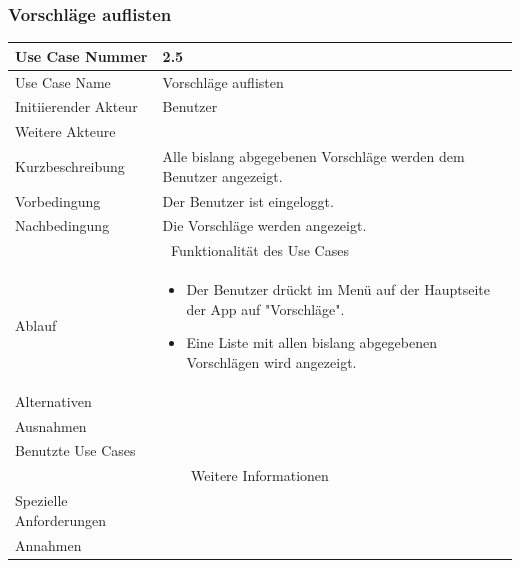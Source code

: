 \documentclass[10pt,a4paper]{article}
\begin{document}
\subsubsection{Vorschl\"age auflisten}
	\begin{tabular}{|l|p{.5\linewidth}|}
	\hline Use Case Nummer & 2.5 \\ 
	\hline Use Case Name & Vorschl\"age auflisten \\ 
	\hline Initiierender Akteur & Benutzer \\
	\hline Weitere Akteure &  \\
	\hline Kurzbeschreibung & Alle bislang abgegebenen Vorschl\"age werden dem Benutzer angezeigt. \\
	\hline Vorbedingung & Der Benutzer ist eingeloggt. \\
	\hline Nachbedingung & Die Vorschl\"age werden angezeigt. \\
	\hline \multicolumn{2}{|c|}{Funktionalität des Use Cases}\\
	\hline Ablauf & \begin{itemize}
		\item Der Benutzer drückt im Men\"u auf der Hauptseite der App auf "Vorschl\"age".
		\item Eine Liste mit allen bislang abgegebenen Vorschlägen wird angezeigt.
	\end{itemize} \\
	\hline Alternativen &  \\
	\hline Ausnahmen &  \\
	\hline Benutzte Use Cases &  \\
	\hline \multicolumn{2}{|c|}{Weitere Informationen} \\
	\hline Spezielle Anforderungen &  \\
	\hline Annahmen &  \\
	\hline
	\end{tabular}
\end{document}
